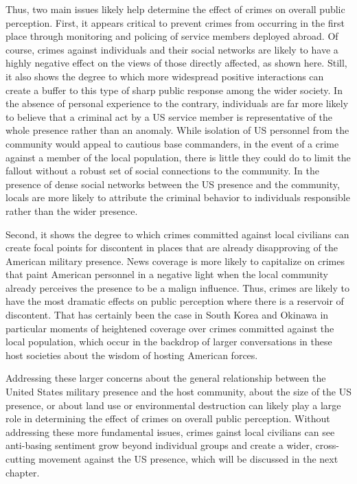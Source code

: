 Thus, two main issues likely help determine the effect of crimes on overall public perception. First, it appears critical to prevent crimes from occurring in the first place through monitoring and policing of service members deployed abroad. Of course, crimes against individuals and their social networks are likely to have a highly negative effect on the views of those directly affected, as shown here. Still, it also shows the degree to which more widespread positive interactions can create a buffer to this type of sharp public response among the wider society. In the absence of personal experience to the contrary, individuals are far more likely to believe that a criminal act by a US service member is representative of the whole presence rather than an anomaly. While isolation of US personnel from the community would appeal to cautious base commanders, in the event of a crime against a member of the local population, there is little they could do to limit the fallout without a robust set of social connections to the community. In the presence of dense social networks between the US presence and the community, locals are more likely to attribute the criminal behavior to individuals responsible rather than the wider presence.

Second, it shows the degree to which crimes committed against local civilians can create focal points for discontent in places that are already disapproving of the American military presence. News coverage is more likely to capitalize on crimes that paint American personnel in a negative light when the local community already perceives the presence to be a malign influence. Thus, crimes are likely to have the most dramatic effects on public perception where there is a reservoir of discontent. That has certainly been the case in South Korea and Okinawa in particular moments of heightened coverage over crimes committed against the local population, which occur in the backdrop of larger conversations in these host societies about the wisdom of hosting American forces.

Addressing these larger concerns about the general relationship between the United States military presence and the host community, about the size of the US presence, or about land use or environmental destruction can likely play a large role in determining the effect of crimes on overall public perception. Without addressing these more fundamental issues, crimes gainst local civilians can see anti-basing sentiment grow beyond individual groups and create a wider, cross-cutting movement against the US presence, which will be discussed in the next chapter.
\begin{comment}








\end{comment}
